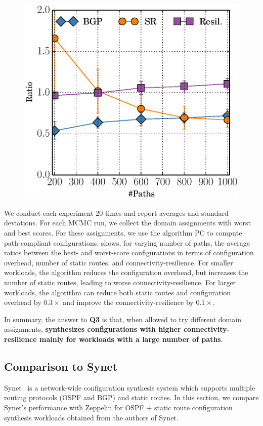 \begin{figure}
\vspace{-5.5mm}
	\includegraphics[width=0.29\columnwidth]{figures/ratioMCMC.eps}
\end{figure}
We conduct each experiment 20 times and report averages and standard
deviations.  For each MCMC run, we collect the domain assignments with
worst and best scores.  For these assignments, we use the algorithm PC
to compute path-compliant configurations.
 shows, for varying number of paths, the average ratios
between the best- and worst-score configurations
in terms of
configuration overhead, number of static routes, and 
connectivity-resilience.
For smaller workloads, 
the algorithm reduces the configuration overhead, but increases
the number of static routes, leading to worse connectivity-resilience. For 
larger workloads, the algorithm can
reduce both static routes 
and configuration overhead by $0.3\times$
and improve the connectivity-resilience 
by $0.1\times$.

In summary, the answer to \textbf{Q3} is that,
when allowed to try different domain assignments,
\textbf{\name synthesizes configurations with higher connectivity-resilience mainly for workloads with a large number of paths}.

\subsection{Comparison to Synet}
\label{sec:synet}
Synet~\cite{synet} is a network-wide configuration synthesis system 
which supports multiple routing protocols (OSPF and BGP) and static 
routes. In this section, we compare Synet's performance with Zeppelin 
for OSPF + static route configuration synthesis workloads obtained from the 
authors of Synet.

